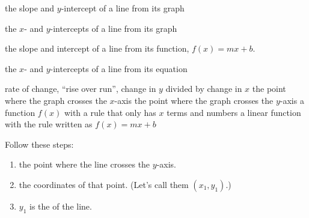 \documentclass[fleqn,letterpaper,12pt,printwatermark=false]{memoir}
\begin{document}
 

\newcommand{\myClassName}{Pre-AP Algebra 2}
\newcommand{\myUnitNumber}{1}
\newcommand{\myUnitTitle}{Introduction to Functions}
\newcommand{\myLessonNumber}{6}
\newcommand{\myLessonTitle}{Attributes of Linear Functions}



\pagestyle{myPagestyle} 

\checkandfixthelayout
{}

\begin{myNotesHeader}
    \item {} the slope and $y$-intercept of a line from its graph
    \item {} the $x$- and $y$-intercepts of a line from its graph
    \item {} the slope and intercept of a line from its function, $f(x) = mx+b$.
    \item {} the $x$- and $y$-intercepts of a line from its equation
\end{myNotesHeader}

\begin{myVocabulary}
    {
        rate of change, ``rise over run'', change in $y$ divided by change in $x$
    }
    {
        the point where the graph crosses the $x$-axis
    }
    {
        the point where the graph crosses the $y$-axis
    }
    {
        a function $f(x)$ with a rule that only has $x$ terms and numbers
    }
    {
        a linear function with the rule written as $f(x) = mx+b$
    }
\end{myVocabulary}

\begin{myKeyConcepts}
    Follow these steps:
    \begin{enumerate}
        \item {}the point where the line crosses the $y$-axis. 
        \item {}the coordinates of that point. (Let's call them $(x_1,y_1)$.)
        \item $y_1$ is the of the line.
    \end{enumerate}
\end{myKeyConcepts}
\end{document}
